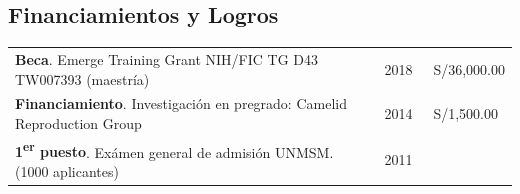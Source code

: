 \documentclass[margin,line]{res}
\begin{document}
\begin{resume}
\newpage
		
		\section{\sc Financiamientos y Logros} %
		
		\begin{tabular}{ l l l }
	
	\textbf{Beca}. Emerge Training Grant NIH/FIC TG D43 TW007393 (maestría) &2018&~S/36,000.00\\ %
	
	
	\textbf{Financiamiento}. Investigación en pregrado: Camelid Reproduction Group&2014&~S/1,500.00\\ %
	
	
	{\bf 1\textsuperscript{er} puesto}. Exámen general de admisión UNMSM. (1000 aplicantes) & 2011 & \\


\end{tabular}
\end{resume}
\end{document}
